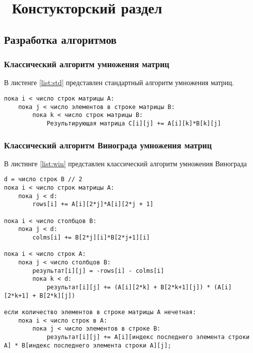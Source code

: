 \chapter{ Констукторский раздел}
\label{cha:design}
\section{ Разработка алгоритмов}

\subsection{ Классический алгоритм умножения матриц}
В листенге \ref{list:std} представлен стандартный алгоритм умножения матриц.

\begin{lstlisting}[caption={Псевдокод стандартного алгоритма умножения матриц.}, label={list:std}]
пока i < число строк матрицы А:
	пока j < число элементов в строке матрицы B:
        пока k < число строк матрицы B:
		    Результирующая матрица C[i][j] += A[i][k]*B[k][j]
\end{lstlisting}	



\subsection{ Классический алгоритм Винограда умножения матриц}
В листинге \ref{list:win} представлен классический алгоритм умножения Винограда

\begin{lstlisting}[caption={Псевдокод алгоритма умножения матриц Винограда.}, label={list:win}]
d = число строк B // 2
пока i < число строк матрицы А:
	пока j < d:
		rows[i] += A[i][2*j]*A[i][2*j + 1]

пока i < число столбцов B:
	пока j < d:
		colms[i] += B[2*j][i]*B[2*j+1][i]

пока i < число строк A:
	пока j < число cтолбцов B:
        результат[i][j] = -rows[i] - colms[i]
        пока k < d:
            результат[i][j] += (A[i][2*k] + B[2*k+1][j]) * (A[i][2*k+1] + B[2*k][j])

если количество элементов в строке матрицы A нечетная:
    пока i < число строк в A:
        пока j < число элементов в строке B:
            результат[i][j] += A[i][индекс последнего элемента строки A] * B[индекс последнего элемента строки A][j];
\end{lstlisting}	



